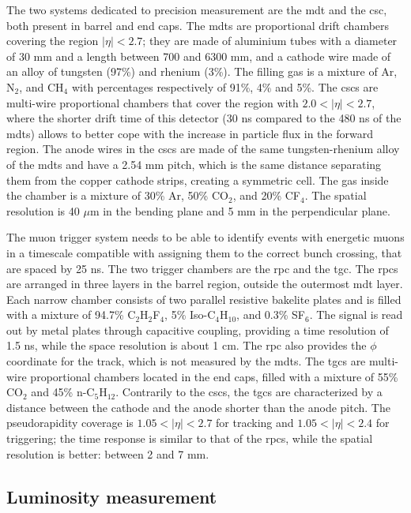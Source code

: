 The two systems dedicated to precision measurement are the \gls{mdt} and the \gls{csc}, both present in barrel and end caps. The \glspl{mdt} are proportional drift chambers covering the region $|\eta|<2.7$; they are made of aluminium tubes with a diameter of 30 mm and a length between 700 and 6300 mm, and a cathode wire made of an alloy of tungsten (97\%) and rhenium (3\%). The filling gas is a mixture of Ar, N$_2$, and CH$_4$ with percentages respectively of 91\%, 4\% and 5\%. The \glspl{csc} are multi-wire proportional chambers that cover the region with $2.0<|\eta|<2.7$, where the shorter drift time of this detector (30 ns compared to the 480 ns of the \glspl{mdt}) allows to better cope with the increase in particle flux in the forward region. The anode wires in the \glspl{csc} are made of the same tungsten-rhenium alloy of the \glspl{mdt} and have a 2.54 mm pitch, which is the same distance separating them from the copper cathode strips, creating a symmetric cell. The gas inside the chamber is a mixture of 30\% Ar, 50\% CO$_2$, and 20\% CF$_4$. The spatial resolution is 40 $\mu$m in the bending plane and 5 mm in the perpendicular plane.

The muon trigger system needs to be able to identify events with energetic muons in a timescale compatible with assigning them to the correct bunch crossing, that are spaced by 25 ns. The two trigger chambers are the \gls{rpc} and the \gls{tgc}. The \glspl{rpc} are arranged in three layers in the barrel region, outside the outermost \gls{mdt} layer. Each narrow chamber consists of two parallel resistive bakelite plates and is filled with a mixture of 94.7\% C$_2$H$_2$F$_4$, 5\% Iso-C$_4$H$_{10}$, and 0.3\% SF$_6$. The signal is read out by metal plates through capacitive coupling, providing a time resolution of 1.5 ns, while the space resolution is about 1 cm. The \gls{rpc} also provides the $\phi$ coordinate for the track, which is not measured by the \glspl{mdt}. The \glspl{tgc} are multi-wire proportional chambers located in the end caps, filled with a mixture of 55\% CO$_2$ and 45\% n-C$_5$H$_{12}$. Contrarily to the \glspl{csc}, the \glspl{tgc} are characterized by a distance between the cathode and the anode shorter than the anode pitch. The pseudorapidity coverage is $1.05<|\eta|<2.7$ for tracking and $1.05<|\eta|<2.4$ for triggering; the time response is similar to that of the \glspl{rpc}, while the spatial resolution is better: between 2 and 7 mm. 

\subsection{Luminosity measurement}
\label{sec:lumimeas}

